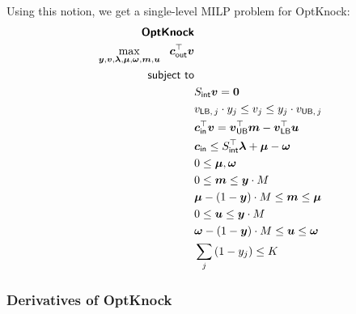 \documentclass[10pt,a4paper]{article}
\newcommand{\mymatrix}[1]{#1}
\newcommand{\myvector}[1]{{\boldsymbol{#1}}}
\newcommand{\stoichmatint}{\mymatrix{S}_{\mathsf{int}}}
\begin{document}
Using this notion, we get a single-level MILP problem for OptKnock:
\begin{eqnarray}\label{eq:optknock2}
\textsf{\textbf{OptKnock}} & \nonumber\\
\max_{\myvector{y},\myvector{v},\myvector{\lambda},\myvector{\mu},\myvector{\omega},\myvector{m},\myvector{u}}~~\myvector{c}_\textsf{out}^\top \myvector{v}&\nonumber\\
\textsf{subject to}&\nonumber\\
&\stoichmatint \myvector{v} = \myvector{0} \nonumber\\
&v_{\textsf{LB},\,j} \cdot y_j \leq v_j \leq y_j \cdot v_{\textsf{UB},\,j} \nonumber\\
&\myvector{c}_\textsf{in}^\top \myvector{v} = \myvector{v}_\textsf{UB}^\top \myvector{m} - \myvector{v}_\textsf{LB}^\top\myvector{u} \nonumber\\
&\myvector{c}_\textsf{in} \leq \stoichmatint^\top \myvector{\lambda} + \myvector{\mu} - \myvector{\omega} \nonumber\\
&0 \leq \myvector{\mu}, \myvector{\omega} \nonumber\\
&0 \leq \myvector{m} \leq \myvector{y} \cdot M \nonumber\\
&\myvector{\mu} - (1 - \myvector{y}) \cdot M \leq \myvector{m} \leq \myvector{\mu} \nonumber\\
&0 \leq \myvector{u} \leq \myvector{y} \cdot M \nonumber\\
&\myvector{\omega} - (1 - \myvector{y}) \cdot M \leq \myvector{u} \leq \myvector{\omega} \nonumber\\
&\sum_j{(1-y_j)} \leq K  
\end{eqnarray}

\subsubsection{Derivatives of OptKnock}
\end{document}
